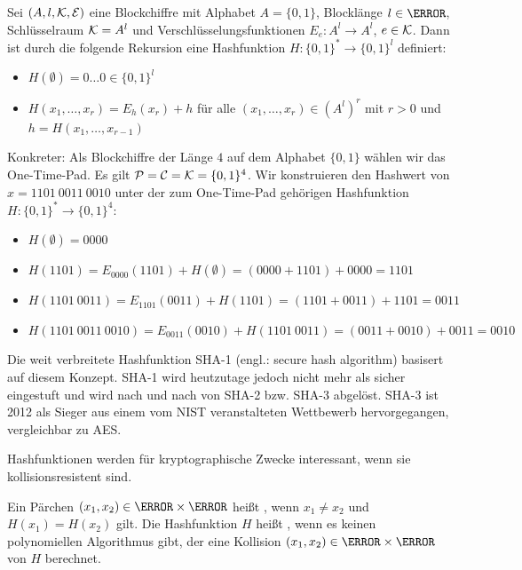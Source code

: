 \begin{example}\label{ex:sha1}
 Sei $(A, l, \mathcal K, \mathcal E)$ eine Blockchiffre mit Alphabet $A = \{0, 1\}$, Blocklänge $l \in \N$, Schlüsselraum $\mathcal K = A^l$ und Verschlüsselungsfunktionen $E_e: A^l → A^l$, $e \in \mathcal K$. Dann ist durch die folgende Rekursion eine Hashfunktion $H: \{0, 1\}^* → \{0, 1\}^l$ definiert:
 \begin{itemize}
  \item $H(\emptyset) = 0\dotsc0 \in \{0, 1\}^l$
  \item $H(x_1, \dots, x_r) = E_h(x_r) + h$ für alle $(x_1, \dotsc, x_r) \in (A^l)^r$ mit $r > 0$ und $h = H(x_1, \dotsc, x_{r-1})$
 \end{itemize}

 Konkreter: Als Blockchiffre der Länge $4$ auf dem Alphabet $\{0, 1\}$ wählen wir das One-Time-Pad. Es gilt $\mathcal P = \mathcal C = \mathcal K = \{0, 1\}^4$. Wir konstruieren den Hashwert von $x = 1101\  0011\   0010$ unter der zum One-Time-Pad gehörigen Hashfunktion $H: \{0, 1\}^* → \{0, 1\}^4$:
 \begin{itemize}
  \item $H(\emptyset) = 0000$
  \item $H(1101) = E_{0000}(1101) + H(\emptyset) = (0000 + 1101) + 0000 = 1101$
  \item $H(1101\  0011) = E_{1101}(0011) + H(1101) = (1101 + 0011) + 1101 = 0011$
  \item $H(1101\  0011\  0010) = E_{0011}(0010) + H(1101\  0011) = (0011 + 0010) + 0011 = 0010$
 \end{itemize}

Die weit verbreitete Hashfunktion SHA-1 (engl.: secure hash algorithm) basisert auf diesem Konzept. SHA-1 wird heutzutage jedoch nicht mehr als sicher eingestuft und wird nach und nach von SHA-2 bzw. SHA-3 abgelöst. SHA-3 ist 2012 als Sieger aus einem vom NIST veranstalteten Wettbewerb hervorgegangen, vergleichbar zu AES.
\end{example}

Hashfunktionen werden für kryptographische Zwecke interessant, wenn sie kollisionsresistent sind.

\begin{definition}
Ein Pärchen $(x_1, x_2) \in \N \times \N$ heißt , wenn $x_1 ≠ x_2$ und $H(x_1) = H(x_2)$ gilt. Die Hashfunktion $H$ heißt , wenn es keinen polynomiellen Algorithmus gibt, der eine Kollision $(x_1, x_2) \in \N \times \N$ von $H$ berechnet.
\end{definition}

